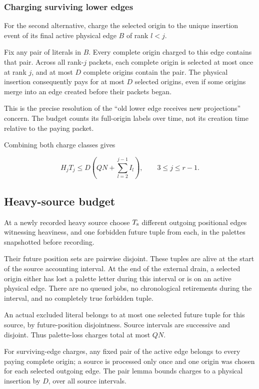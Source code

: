 \subsubsection{Charging surviving lower edges}\label{charging-surviving-lower-edges}

For the second alternative, charge the selected origin to the unique insertion event of its final active physical edge \(B\) of rank \(l<j\).

Fix any pair of literals in \(B\). Every complete origin charged to this edge contains that pair. Across all rank-\(j\) packets, each complete origin is selected at most once at rank \(j\), and at most \(D\) complete origins contain the pair. The physical insertion consequently pays for at most \(D\) selected origins, even if some origins merge into an edge created before their packets began.

This is the precise resolution of the ``old lower edge receives new projections'' concern. The budget counts its full-origin labels over time, not its creation time relative to the paying packet.

Combining both charge classes gives

\[
H_jT_j\le D\left(QN+\sum_{l=2}^{j-1}I_l\right),
\qquad 3\le j\le r-1. \tag{8.2}
\]

\subsection{Heavy-source budget}\label{heavy-source-budget}

At a newly recorded heavy source choose \(T_{\rm s}\) different outgoing positional edges witnessing heaviness, and one forbidden future tuple from each, in the palettes snapshotted before recording.

Their future position sets are pairwise disjoint. These tuples are alive at the start of the source accounting interval. At the end of the external drain, a selected origin either has lost a palette letter during this interval or is on an active physical edge. There are no queued jobs, no chronological retirements during the interval, and no completely true forbidden tuple.

An actual excluded literal belongs to at most one selected future tuple for this source, by future-position disjointness. Source intervals are successive and disjoint. Thus palette-loss charges total at most \(QN\).

For surviving-edge charges, any fixed pair of the active edge belongs to every paying complete origin; a source is processed only once and one origin was chosen for each selected outgoing edge. The pair lemma bounds charges to a physical insertion by \(D\), over all source intervals.

